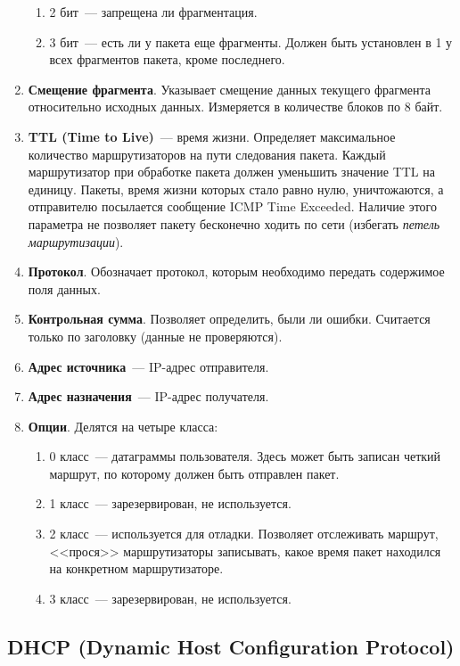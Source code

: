 \begin{enumerate}
\begin{enumerate}
              \item 2 бит~--- запрещена ли фрагментация.
              \item 3 бит~--- есть ли у пакета еще фрагменты. Должен быть установлен в 1 у всех фрагментов пакета, кроме последнего.
          \end{enumerate}
    \item \textbf{Смещение фрагмента}. Указывает смещение данных текущего фрагмента относительно исходных данных. Измеряется в количестве блоков по 8 байт.
    \item \textbf{TTL (Time to Live)}~--- время жизни. Определяет максимальное количество маршрутизаторов на пути следования пакета. Каждый маршрутизатор при обработке пакета должен уменьшить значение TTL на единицу. Пакеты, время жизни которых стало равно нулю, уничтожаются, а отправителю посылается сообщение ICMP Time Exceeded. Наличие этого параметра не позволяет пакету бесконечно ходить по сети (избегать \textit{петель маршрутизации}).
    \item \textbf{Протокол}. Обозначает протокол, которым необходимо передать содержимое поля данных.
    \item \textbf{Контрольная сумма}. Позволяет определить, были ли ошибки. Считается только по заголовку (данные не проверяются).
    \item \textbf{Адрес источника}~--- IP-адрес отправителя.
    \item \textbf{Адрес назначения}~--- IP-адрес получателя.
    \item \textbf{Опции}. Делятся на четыре класса:
          \begin{enumerate}
              \item 0 класс~--- датаграммы пользователя. Здесь может быть записан четкий маршрут, по которому должен быть отправлен пакет.
              \item 1 класс~--- зарезервирован, не используется.
              \item 2 класс~--- используется для отладки. Позволяет отслеживать маршрут, <<прося>> маршрутизаторы записывать, какое время пакет находился на конкретном маршрутизаторе.
              \item 3 класс~--- зарезервирован, не используется.
          \end{enumerate}
\end{enumerate}

\subsection{DHCP (Dynamic Host Configuration Protocol)}

